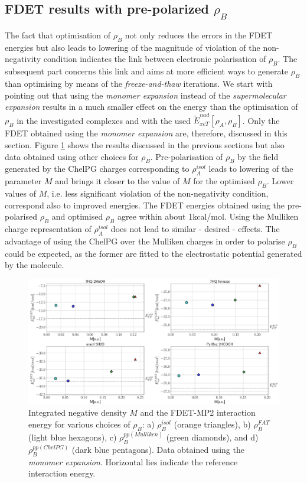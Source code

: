 \documentclass[amsmath,amssymb,preprint,aip,jcp]{revtex4-1}
\begin{document}
\subsection{FDET results with pre-polarized $\rho_B$}
The fact that optimisation of $\rho_B$ not only reduces the errors in the FDET energies but also leads to lowering of the magnitude of violation of the non-negativity condition indicates the link between electronic polarisation of $\rho_B$. 
The subsequent part concerns this link and aims at more efficient ways to generate $\rho_B$ than optimising by means of the {\it freeze-and-thaw} iterations. 
We start with pointing out that using the {\it monomer expansion} instead of the {\it supermolecular expansion} results in a much smaller effect on the energy than the optimisation of $\rho_B$ in the investigated complexes and with the used $\tilde{E}_{xcT}^{nad}[\rho_A,\rho_B]$. 
Only the FDET obtained using the {\it monomer expansion} are, therefore, discussed in this section.
Figure \ref{fig:M_vs_MP} shows the results discussed in the previous sections but also data obtained using other choices for $\rho_B$.
Pre-polarisation of $\rho_B$ by the field generated by the ChelPG charges corresponding to $\rho_A^{isol}$ leads to lowering of the parameter $M$ and brings it closer to the value of $M$ for the optimised $\rho_B$. 
Lower values of $M$, i.e. less significant violation of the non-negativity condition, correspond also to improved energies. 
The FDET energies obtained using the pre-polarised $\rho_B$ and optimised $\rho_B$ agree within about 1kcal/mol.
Using the Mulliken charge representation of $\rho_A^{isol}$ does not lead to similar - desired - effects. 
The advantage of using the ChelPG over the Mulliken charges in order to polarise $\rho_B$ could be expected, as the former are fitted to the electrostatic potential generated by the molecule.
\begin{figure}
\centering
\includegraphics[width=1.0\linewidth]{M_vs_MP.pdf}
\caption{Integrated negative density $M$ and the FDET-MP2 interaction energy for various choices of $\rho_B$: a) $\rho_B^{isol}$ (orange triangles), b) $\rho_B^{FAT}$ (light blue hexagons), c) $\rho_B^{pp(Mulliken)}$ (green diamonds), and d) $\rho_B^{pp(ChelPG)}$ (dark blue pentagons). Data obtained using the {\it monomer expansion}. Horizontal lies indicate the reference interaction energy.}
\label{fig:M_vs_MP}
\end{figure}
\end{document}
